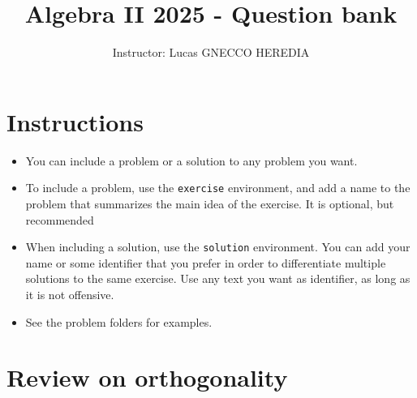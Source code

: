 \documentclass[11pt,a4paper]{article}
\title{\vspace{-1.2cm} Algebra II 2025 - Question bank} %
\author{Instructor: Lucas GNECCO HEREDIA}
\theoremstyle{break}
\begin{document}
\maketitle 
\thispagestyle{fancy}



\section*{Instructions}
\begin{itemize}[itemsep=0.05em]
    \item You can include a problem or a solution to any problem you want.
    \item To include a problem, use the \verb|exercise| environment, and add a name to the problem that summarizes the main idea of the exercise. It is optional, but recommended
    \item When including a solution, use the \verb|solution| environment. You can add your name or some identifier that you prefer in order to differentiate multiple solutions to the same exercise. Use any text you want as identifier, as long as it is not offensive.
    \item See the problem folders for examples.  
\end{itemize}




\section{Review on orthogonality}


\end{document}
